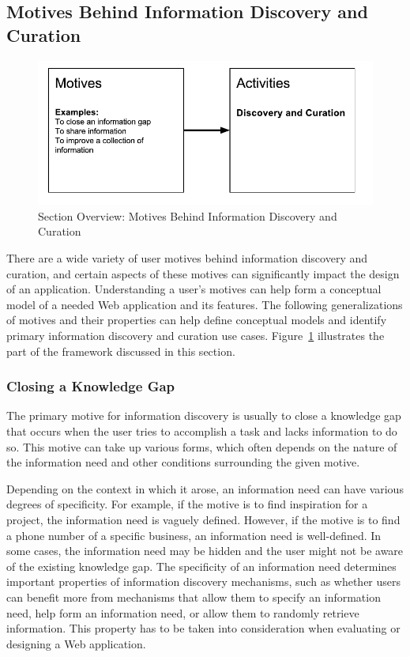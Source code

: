 \documentclass{sigchi}
\begin{document}
{{\subsection{Motives Behind Information Discovery and Curation}

\label{section:motives}
\begin{figure}[ht!]
	\noindent
	\centering
    \includegraphics[width=\linewidth]{figures/motives.pdf}
	\caption{Section Overview: Motives Behind Information Discovery and Curation}
	\label{fig:motives} 
\end{figure}

There are a wide variety of user motives behind information discovery and curation, and certain aspects of these motives can significantly impact the design of an application. Understanding a user's motives can help form a conceptual model of a needed Web application and its features. The following generalizations of motives and their properties can help define conceptual models and identify primary information discovery and curation use cases. Figure~\ref{fig:motives} illustrates the part of the framework discussed in this section.  

{\subsubsection{Closing a Knowledge Gap}
The primary motive for information discovery is usually to close a knowledge gap that occurs when the user tries to accomplish a task and lacks information to do so. This motive can take up various forms, which often depends on the nature of the information need and other conditions surrounding the given motive.        

Depending on the context in which it arose, an information need can have various degrees of specificity. For example, if the motive is to find inspiration for a project, the information need is vaguely defined. However, if the motive is to find a phone number of a specific business, an information need is well-defined. In some cases, the information need may be hidden and the user might not be aware of the existing knowledge gap. The specificity of an information need determines important properties of information discovery mechanisms, such as whether users can benefit more from mechanisms that allow them to specify an information need, help form an information need, or allow them to randomly retrieve information. This property has to be taken into consideration when evaluating or designing a Web application. 

}}}
\end{document}
